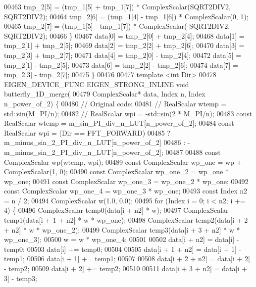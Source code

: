 \begin{DoxyCode}
00463       tmp\_2[5] = (tmp\_1[5] + tmp\_1[7]) * ComplexScalar(SQRT2DIV2, SQRT2DIV2);
00464       tmp\_2[6] = (tmp\_1[4] - tmp\_1[6]) * ComplexScalar(0, 1);
00465       tmp\_2[7] = (tmp\_1[5] - tmp\_1[7]) * ComplexScalar(-SQRT2DIV2, SQRT2DIV2);
00466     \}
00467     data[0] = tmp\_2[0] + tmp\_2[4];
00468     data[1] = tmp\_2[1] + tmp\_2[5];
00469     data[2] = tmp\_2[2] + tmp\_2[6];
00470     data[3] = tmp\_2[3] + tmp\_2[7];
00471     data[4] = tmp\_2[0] - tmp\_2[4];
00472     data[5] = tmp\_2[1] - tmp\_2[5];
00473     data[6] = tmp\_2[2] - tmp\_2[6];
00474     data[7] = tmp\_2[3] - tmp\_2[7];
00475   \}
00476 
00477   \textcolor{keyword}{template} <\textcolor{keywordtype}{int} Dir>
00478   EIGEN\_DEVICE\_FUNC EIGEN\_STRONG\_INLINE \textcolor{keywordtype}{void} butterfly\_1D\_merge(
00479       ComplexScalar* data, Index n, Index n\_power\_of\_2) \{
00480     \textcolor{comment}{// Original code:}
00481     \textcolor{comment}{// RealScalar wtemp = std::sin(M\_PI/n);}
00482     \textcolor{comment}{// RealScalar wpi =  -std::sin(2 * M\_PI/n);}
00483     \textcolor{keyword}{const} RealScalar wtemp = m\_sin\_PI\_div\_n\_LUT[n\_power\_of\_2];
00484     \textcolor{keyword}{const} RealScalar wpi = (Dir == FFT\_FORWARD)
00485                                ? m\_minus\_sin\_2\_PI\_div\_n\_LUT[n\_power\_of\_2]
00486                                : -m\_minus\_sin\_2\_PI\_div\_n\_LUT[n\_power\_of\_2];
00487 
00488     \textcolor{keyword}{const} ComplexScalar wp(wtemp, wpi);
00489     \textcolor{keyword}{const} ComplexScalar wp\_one = wp + ComplexScalar(1, 0);
00490     \textcolor{keyword}{const} ComplexScalar wp\_one\_2 = wp\_one * wp\_one;
00491     \textcolor{keyword}{const} ComplexScalar wp\_one\_3 = wp\_one\_2 * wp\_one;
00492     \textcolor{keyword}{const} ComplexScalar wp\_one\_4 = wp\_one\_3 * wp\_one;
00493     \textcolor{keyword}{const} Index n2 = n / 2;
00494     ComplexScalar w(1.0, 0.0);
00495     \textcolor{keywordflow}{for} (Index i = 0; i < n2; i += 4) \{
00496        ComplexScalar temp0(data[i + n2] * w);
00497        ComplexScalar temp1(data[i + 1 + n2] * w * wp\_one);
00498        ComplexScalar temp2(data[i + 2 + n2] * w * wp\_one\_2);
00499        ComplexScalar temp3(data[i + 3 + n2] * w * wp\_one\_3);
00500        w = w * wp\_one\_4;
00501 
00502        data[i + n2] = data[i] - temp0;
00503        data[i] += temp0;
00504 
00505        data[i + 1 + n2] = data[i + 1] - temp1;
00506        data[i + 1] += temp1;
00507 
00508        data[i + 2 + n2] = data[i + 2] - temp2;
00509        data[i + 2] += temp2;
00510 
00511        data[i + 3 + n2] = data[i + 3] - temp3;

\end{DoxyCode}
